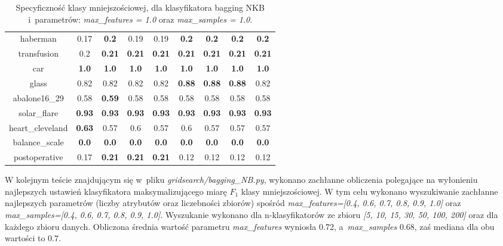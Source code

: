 \begin{table}[H]
\begin{center}
{\begin{tabular}{c|cccccccc}
					haberman&0.17&\textbf{0.2}&0.19&0.19&\textbf{0.2}&\textbf{0.2}&\textbf{0.2}&\textbf{0.2}\\%
					
					transfusion&0.2&\textbf{0.21}&\textbf{0.21}&\textbf{0.21}&\textbf{0.21}&\textbf{0.21}&\textbf{0.21}&\textbf{0.21}\\%
					
					car&\textbf{1.0}&\textbf{1.0}&\textbf{1.0}&\textbf{1.0}&\textbf{1.0}&\textbf{1.0}&\textbf{1.0}&\textbf{1.0}\\%
					
					glass&0.82&0.82&0.82&0.82&\textbf{0.88}&\textbf{0.88}&\textbf{0.88}&0.82\\%
					
					abalone16\_29&0.58&\textbf{0.59}&0.58&0.58&0.58&0.58&0.58&0.58\\%
					
					solar\_flare&\textbf{0.93}&\textbf{0.93}&\textbf{0.93}&\textbf{0.93}&\textbf{0.93}&\textbf{0.93}&\textbf{0.93}&\textbf{0.93}\\%
					
					heart\_cleveland&\textbf{0.63}&0.57&0.6&0.57&0.6&0.57&0.57&0.57\\%
					
					balance\_scale&\textbf{0.0}&\textbf{0.0}&\textbf{0.0}&\textbf{0.0}&\textbf{0.0}&\textbf{0.0}&\textbf{0.0}&\textbf{0.0}\\%
					
					postoperative&0.17&\textbf{0.21}&\textbf{0.21}&\textbf{0.21}&0.12&0.12&0.12&0.12\\%
					
				\end{tabular}}
				\caption{Specyficzność klasy mniejszościowej, dla klasyfikatora bagging NKB i~parametrów: \textit{max\_features = 1.0} oraz \textit{max\_samples = 1.0}.}
				\label{bagging-specyficznosc11}
			\end{center}
		\end{table}
\par
W kolejnym teście znajdującym się w~pliku \textit{gridsearch/bagging\_NB.py}, wykonano zachłanne obliczenia polegające na wyłonieniu najlepszych ustawień klasyfikatora maksymalizującego miarę $F_1$ klasy mniejszościowej. W tym celu wykonano wyszukiwanie zachłanne najlepszych parametrów (liczby atrybutów oraz liczebności zbiorów) spośród \textit{max\_features=[0.4, 0.6, 0.7, 0.8, 0.9, 1.0]} oraz \textit{max\_samples=[0.4, 0.6, 0.7, 0.8, 0.9, 1.0]}. Wyszukanie wykonano dla n-klasyfikatorów ze zbioru \textit{[5, 10, 15, 30, 50, 100, 200]} oraz dla każdego zbioru danych. Obliczona średnia wartość parametru \textit{max\_features} wyniosła 0.72, a~\textit{max\_samples} 0.68, zaś mediana dla obu wartości to 0.7. \par
